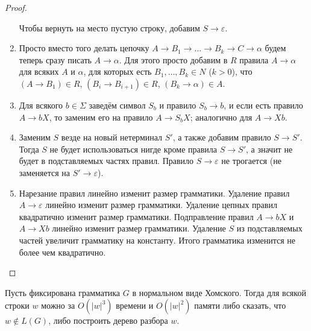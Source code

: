 \documentclass[12pt,a4paper]{article}
\begin{document}
\begin{proof}
\begin{enumerate}
                Чтобы вернуть на место пустую строку, добавим $S \to \varepsilon$.

            \item Просто вместо того делать цепочку $A \to B_1 \to \dots \to B_k \to C \to \alpha$ будем теперь сразу писать $A \to \alpha$. Для этого просто добавим в $R$ правила $A \to \alpha$ для всяких $A$ и $\alpha$, для которых есть $B_1, \dots, B_k \in N$ ($k > 0$), что $(A \to B_1) \in R$, $(B_{i} \to B_{i+1}) \in R$, $(B_k \to \alpha) \in A$.

            \item Для всякого $b \in \Sigma$ заведём символ $S_b$ и правило $S_b \to b$, и если есть правило $A \to bX$, то заменим его на правило $A \to S_b X$; аналогично для $A \to X b$.

            \item Заменим $S$ везде на новый нетерминал $S'$, а также добавим правило $S \to S'$. Тогда $S$ не будет использоваться нигде кроме правила $S \to S'$, а значит не будет в подставляемых частях правил. Правило $S \to \varepsilon$ не трогается (не заменяется на $S' \to \varepsilon$).
            
            \item Нарезание правил линейно изменит размер грамматики. Удаление правил $A \to \varepsilon$ линейно изменит размер грамматики. Удаление цепных правил квадратично изменит размер грамматики. Подправление правил $A \to bX$ и $A \to Xb$ линейно изменит размер грамматики. Удаление $S$ из подставляемых частей увеличит грамматику на константу. Итого грамматика изменится не более чем квадратично.
        \end{enumerate}
    \end{proof}

    \begin{theorem}
        Пусть фиксирована грамматика $G$ в нормальном виде Хомского. Тогда для всякой строки $w$ можно за $O(|w|^3)$ времени и $O(|w|^2)$ памяти либо сказать, что $w \notin L(G)$, либо построить дерево разбора $w$.
    \end{theorem}
\end{document}
